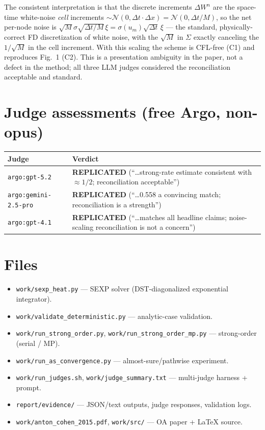 \documentclass[11pt]{article}
\begin{document}
The consistent interpretation is that the discrete increments $\Delta W^n$ are the space-time
white-noise \emph{cell} increments $\sim \mathcal{N}(0,\Delta t\cdot \Delta x)=
\mathcal{N}(0,\Delta t/M)$, so the net per-node noise is
$\sqrt{M}\sigma\sqrt{\Delta t/M}\,\xi = \sigma(u_m)\sqrt{\Delta t}\,\xi$ --- the standard,
physically-correct FD discretization of white noise, with the $\sqrt{M}$ in $\Sigma$ exactly
canceling the $1/\sqrt{M}$ in the cell increment. With this scaling the scheme is CFL-free (C1)
and reproduces Fig.\ 1 (C2). This is a presentation ambiguity in the paper, not a defect in the
method; all three LLM judges considered the reconciliation acceptable and standard.

\section{Judge assessments (free Argo, non-opus)}

\begin{center}
\begin{tabular}{ll}
\toprule
Judge & Verdict \\
\midrule
\texttt{argo:gpt-5.2}          & \textbf{REPLICATED} (``\ldots strong-rate estimate consistent with $\approx 1/2$; reconciliation acceptable'') \\
\texttt{argo:gemini-2.5-pro}   & \textbf{REPLICATED} (``\ldots 0.558 a convincing match; reconciliation is a strength'') \\
\texttt{argo:gpt-4.1}          & \textbf{REPLICATED} (``\ldots matches all headline claims; noise-scaling reconciliation is not a concern'') \\
\bottomrule
\end{tabular}
\end{center}

\section{Files}

\begin{itemize}
  \item \texttt{work/sexp\_heat.py} --- SEXP solver (DST-diagonalized exponential integrator).
  \item \texttt{work/validate\_deterministic.py} --- analytic-case validation.
  \item \texttt{work/run\_strong\_order.py}, \texttt{work/run\_strong\_order\_mp.py} --- strong-order (serial / MP).
  \item \texttt{work/run\_as\_convergence.py} --- almost-sure/pathwise experiment.
  \item \texttt{work/run\_judges.sh}, \texttt{work/judge\_summary.txt} --- multi-judge harness + prompt.
  \item \texttt{report/evidence/} --- JSON/text outputs, judge responses, validation logs.
  \item \texttt{work/anton\_cohen\_2015.pdf}, \texttt{work/src/} --- OA paper + LaTeX source.
\end{itemize}
\end{document}
